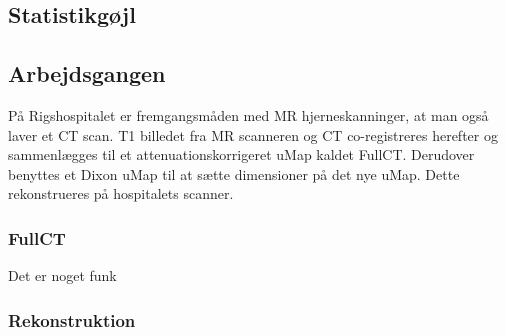 \subsection{Statistikgøjl}



\subsection{Arbejdsgangen}


På Rigshospitalet er fremgangsmåden med MR
hjerneskanninger, at man også laver et CT scan. T1 billedet fra MR scanneren
og CT co-registreres herefter og sammenlægges til et attenuationskorrigeret
uMap kaldet FullCT. Derudover benyttes et Dixon uMap til at sætte dimensioner
på det nye uMap. Dette rekonstrueres på hospitalets scanner.


\subsubsection{FullCT}


Det er noget funk

\subsubsection{Rekonstruktion}

